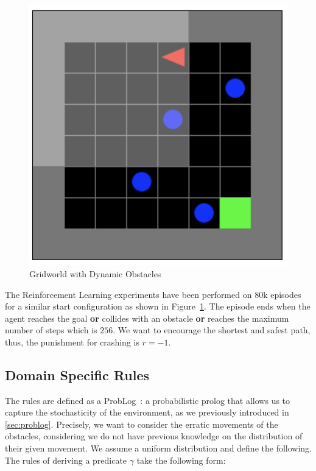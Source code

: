 \begin{multicols}{2}[\medskip]
    \begin{figure}[H]
      \centering
      \includegraphics[scale=0.4]{figures/gridworldrl.png}
      \caption{Gridworld with Dynamic Obstacles}
      \label{fig:gridrl}
    \end{figure}
    \columnbreak
    The Reinforcement Learning experiments have been performed on 80k 
    episodes for a similar start configuration as shown in Figure~\ref{fig:gridrl}. The episode ends when the agent 
    reaches the goal \textbf{or} collides with an obstacle \textbf{or} reaches the maximum number of steps which is $256$. We want to encourage the shortest and safest path, thus, the punishment for crashing is $r = -1$. 
\end{multicols}

\subsection{Domain Specific Rules}
The rules are defined as a ProbLog~\cite{problog}: a probabilistic prolog that allows us to capture 
the stochasticity of the environment, as we previously introduced in \ref{sec:problog}. Precisely, we want to consider the erratic movements of the obstacles, considering 
we do not have previous knowledge on the distribution of their given movement. We assume a uniform distribution and define the following. 
The rules of \dio{} deriving a predicate $\gamma$ take the following form: 

